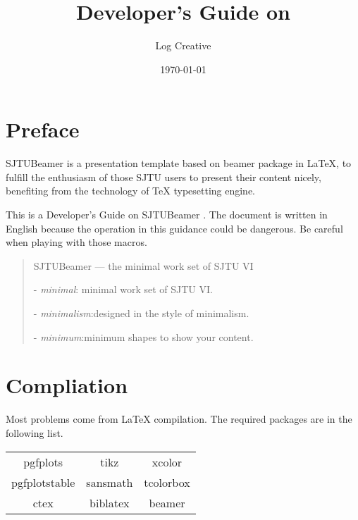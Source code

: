 \documentclass{article}
\title{Developer's Guide on\\ \tmin}
\author{Log Creative}
\date{\today}
\def\tmin{\textsf{SJTUBeamer} \fbox{\textsc{min}}}
\begin{document}
    \maketitle
    \tableofcontents
    \clearpage
    \section{Preface}

    \tmin{} is a presentation template based on \textsf{beamer} package in \LaTeX{}, to fulfill the enthusiasm of those SJTU users to present their content nicely, benefiting from the technology of \TeX{} typesetting engine.
    
    This is a Developer's Guide on \tmin{} . The document is written in English because the operation in this guidance could be dangerous. Be careful when playing with those macros.

    \begin{quotation}
        \begin{center}
            \tmin{} --- the minimal work set of SJTU VI
        \end{center}
        \vspace*{1em}

         - \emph{minimal}: \hfill minimal work set of SJTU VI.

         - \emph{minimalism}:\hfill  designed in the style of minimalism.

         - \emph{minimum}:\hfill  minimum shapes to show your content.
    \end{quotation}

    \section{Compliation}

    Most problems come from \LaTeX{} compilation. The required packages are in the following list.
    
    \begin{table}[h]
        \centering
        \begin{tabular}{>{\sffamily}c>{\sffamily}c>{\sffamily}c}
            \hline
            pgfplots & tikz & xcolor \\
            pgfplotstable & sansmath & tcolorbox \\
            ctex & biblatex & beamer \\
            \hline
        \end{tabular}
    \end{table}
\end{document}
